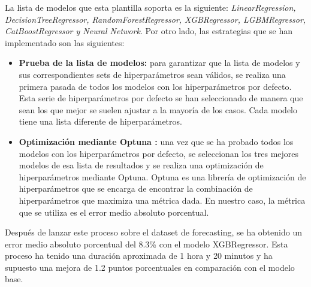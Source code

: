 La lista de modelos que esta plantilla soporta es la siguiente: \textit{LinearRegression, 
DecisionTreeRegressor, RandomForestRegressor, XGBRegressor, LGBMRegressor, CatBoostRegressor
y Neural Network}. Por otro lado, las estrategias que se han implementado son las siguientes:

\begin{itemize}
    \item \textbf{Prueba de la lista de modelos:} para garantizar que la lista
    de modelos y sus correspondientes sets de hiperparámetros sean válidos, se
    realiza una primera pasada de todos los modelos con los hiperparámetros por defecto.
    Esta serie de hiperparámetros por defecto se han seleccionado de manera que sean
    los que mejor se suelen ajustar a la mayoría de los casos. Cada modelo tiene una
    lista diferente de hiperparámetros.
    \item \textbf{Optimización mediante Optuna \cite{Optuna}:} una vez que se ha probado todos los modelos
    con los hiperparámetros por defecto, se seleccionan los tres mejores modelos de esa lista
    de resultados y se realiza una optimización de hiperparámetros mediante Optuna. Optuna
    es una librería de optimización de hiperparámetros que se encarga de encontrar la combinación
    de hiperparámetros que maximiza una métrica dada. En nuestro caso, la métrica que se
    utiliza es el error medio absoluto porcentual.
\end{itemize}

Después de lanzar este proceso sobre el dataset de forecasting, se ha obtenido
un error medio absoluto porcentual del 8.3\% con el modelo XGBRegressor. Esta proceso
ha tenido una duración aproximada de 1 hora y 20 minutos y ha supuesto una mejora de
1.2 puntos porcentuales en comparación con el modelo base. 